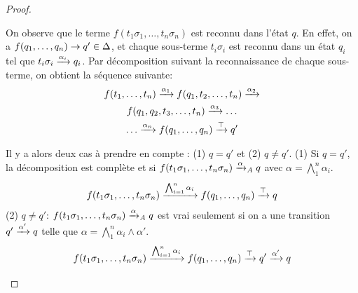 \begin{proof}
\begin{itemize}
  On  observe que le terme $f(t_1\sigma_1,\dots, t_n\sigma_n)$ est reconnu dans l'état $q$. En effet, on a  $f(q_1,\dots, q_n) \rightarrow q' \in \Delta$, et chaque sous-terme
  $t_i\sigma_i$ est reconnu dans un état $q_i$ tel que $t_i\sigma_i \xrightarrow{\alpha_i} q_i$. 
  Par décomposition suivant la reconnaissance de chaque sous-terme, on obtient la séquence suivante:
  \begin{multline*}
    \label{eq:1}
    f(t_1,\dots, t_n) \xrightarrow{\alpha_1} f(q_1, t_2, \dots, t_n) \xrightarrow{\alpha_2} \\
    f(q_1, q_2, t_3, \dots, t_n) \xrightarrow{\alpha_3} \dots \\
    \dots \xrightarrow{\alpha_n} f(q_1,\dots, q_n) \xrightarrow{\top} q'
  \end{multline*}

  Il y a alors deux cas à prendre en compte : (1) $q=q'$ et (2) $q \not = q'$.
  (1) Si $q=q'$, la décomposition est complète et si $f(t_1\sigma_1,\dots, t_n\sigma_n) \xrightarrow{\alpha}_\mathit A q$ avec $\alpha = \bigwedge_1^n \alpha_i$.
  \[f(t_1\sigma_1,\dots, t_n\sigma_n) \xrightarrow{\bigwedge_{i = 1}^n \alpha_i} f(q_1,\dots,q_n) \xrightarrow{\top} q\]
  (2) $q \not = q'$: $f(t_1\sigma_1,\dots, t_n\sigma_n) \xrightarrow{\alpha}_\mathit A q$ est vrai seulement si on a une transition $q' \xrightarrow{\alpha'} q$
  telle que $\alpha = \bigwedge_1^n \alpha_i \land \alpha'$.
  \[f(t_1\sigma_1,\dots, t_n\sigma_n) \xrightarrow{\bigwedge_{i = 1}^n \alpha_i} f(q_1,\dots,q_n) \xrightarrow{\top} q' \xrightarrow{\alpha'} q\]

\end{itemize}
\end{proof}
